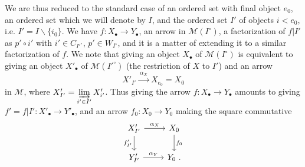 We are thus reduced to the standard case of an ordered set with final object $e_0$, an ordered set which we will denote by $I$, and the ordered set $I'$ of objects $i<e_0$, i.e. $I'=I\backslash\{i_0\}$. %
We have $f:X_\bullet\longrightarrow Y_\bullet$, an arrow in $\mathcal{M}(I^\circ)$, a factorization of $f|I'$ as $p'\circ i'$ with $i'\in C_{I'^\circ}$, $p'\in W_{I^\circ}$, %
and it is a matter of extending it to a similar factorization of $f$. We note that giving an object $X_\bullet$ of $\mathcal{M}(I^\circ)$ is equivalent to giving an object $X'_\bullet$ of $\mathcal{M}(I'^\circ)$ (the restriction of $X$ to $I'$) and an arrow
\[
X'_{I'} \xrightarrow{\ \alpha_X\ } X_{e_0}=X_0
\]
in $\mathcal{M}$, where $X'_{I'}=\varinjlim\limits_{i'\in I'}X'_{i'}$. Thus giving the arrow $f:X_\bullet\longrightarrow Y_\bullet$ amounts to giving $f'=f|I':X'_\bullet\longrightarrow Y'_\bullet$, and an arrow $f_0:X_0\longrightarrow Y_0$ making the square commutative
\[
\begin{tikzcd}
X'_{I'} \arrow[r, "\alpha_X"] \arrow[d, "f'_{I'}"'] & X_0 \arrow[d, "f_0"] \\
Y'_{I'} \arrow[r, "\alpha_Y"] & Y_0\ .
\end{tikzcd}
\]

